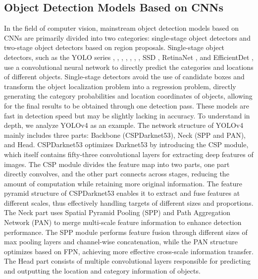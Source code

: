 \documentclass[journal]{IEEEtran}
\begin{document}
\subsection{ Object Detection Models Based on CNNs}
In the field of computer vision, mainstream object detection models based on CNNs are primarily divided into two categories: single-stage object detectors and two-stage object detectors based on region proposals. Single-stage object detectors, such as the YOLO series \cite{redmon2017yolo9000}, \cite{bochkovskiy2020yolov4}, \cite{redmon2018yolov3}, \cite{li2022yolov6}, \cite{redmon2016you}, \cite{zhang2023superyolo}, \cite{hou2022sr}, SSD \cite{liu2016ssd}, RetinaNet \cite{lin2017focal}, and EfficientDet \cite{tan2020efficientdet}, use a convolutional neural network to directly predict the categories and locations of different objects. Single-stage detectors avoid the use of candidate boxes and transform the object localization problem into a regression problem, directly generating the category probabilities and location coordinates of objects, allowing for the final results to be obtained through one detection pass. These models are fast in detection speed but may be slightly lacking in accuracy. To understand in depth, we analyze YOLOv4\cite{bochkovskiy2020yolov4} as an example. The network structure of YOLOv4 mainly includes three parts: Backbone (CSPDarknet53), Neck (SPP and PAN), and Head. CSPDarknet53 optimizes Darknet53 by introducing the CSP module, which itself contains fifty-three convolutional layers for extracting deep features of images. The CSP module divides the feature map into two parts, one part directly convolves, and the other part connects across stages, reducing the amount of computation while retaining more original information. The feature pyramid structure of CSPDarknet53 enables it to extract and fuse features at different scales, thus effectively handling targets of different sizes and proportions. The Neck part uses Spatial Pyramid Pooling (SPP) and Path Aggregation Network (PAN) to merge multi-scale feature information to enhance detection performance. The SPP module performs feature fusion through different sizes of max pooling layers and channel-wise concatenation, while the PAN structure optimizes based on FPN, achieving more effective cross-scale information transfer. The Head part consists of multiple convolutional layers responsible for predicting and outputting the location and category information of objects.
\end{document}
